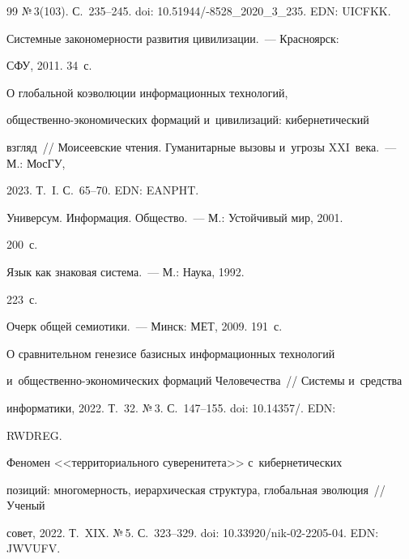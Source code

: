 {{\begin{thebibliography}{99}
№\,3(103). С.~235--245. doi: 10.51944\!/-8528\_2020\_3\_235. EDN: UICFKK.







 Системные закономерности развития цивилизации.~--- Красноярск: 


СФУ, 2011. 34~с.




 О глобальной коэволюции информационных технологий,  


об\-щест\-вен\-но-эко\-но\-ми\-че\-ских формаций и~цивилизаций: кибернетический 


взгляд~/\!\!/ Моисеевские чтения. Гуманитарные вызовы и~угрозы XXI~века.~--- М.: МосГУ, 


2023. Т.~I. С.~65--70. EDN: EANPHT.







 Универсум. Информация. Общество.~--- М.: Устойчивый мир, 2001. 


200~с.




 Язык как знаковая система.~--- М.: Наука, 1992. 


223~с.




 Очерк общей семиотики.~--- Минск: МЕТ, 2009. 191~с.




 О сравнительном генезисе базисных информационных технологий 


и~об\-щест\-вен\-но-эко\-но\-ми\-че\-ских формаций Человечества~/\!\!/ Системы и~средства 


информатики, 2022. Т.~32. №\,3. С.~147--155. doi: 10.14357\!/. EDN: 


RWDREG.







 Феномен <<территориального суверенитета>> с~кибернетических 


позиций: многомерность, иерархическая структура, глобальная эволюция~/\!\!/ Ученый 


совет, 2022. Т.~XIX. №\,5. С.~323--329. doi: 10.33920\!/\!nik-02-2205-04. EDN: \mbox{JWVUFV}.






\end{thebibliography}}}

